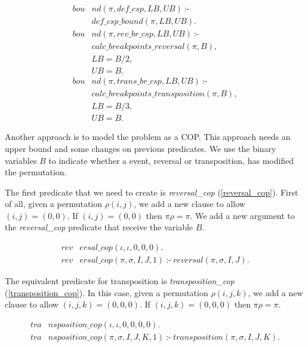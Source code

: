 \begin{align}
  \label{bound}
  \textit{bou}&\textit{nd}(\pi, def\_csp, LB, UB)~\text{:-} \nonumber\\
  &\textit{def\_csp\_bound}(\pi, LB, UB). \nonumber \\
  \textit{bou}&\textit{nd}(\pi, rev\_br\_csp, LB, UB)~\text{:-} \nonumber \\
  &\textit{calc\_breakpoints\_reversal}(\pi, B), \nonumber\\
  &LB = B / 2 ,  \\
  &UB = B. \nonumber \\
  \textit{bou}&\textit{nd}(\pi, trans\_br\_csp, LB, UB)~\text{:-} \nonumber\\
  &\textit{calc\_breakpoints\_transposition}(\pi, B), \nonumber\\
  &LB = B / 3, \nonumber \\
  &UB = B. \nonumber
\end{align}

Another approach is to model the problem as a COP. This approach needs
an upper bound and some changes on previous predicates. We use the
binary variables $B$ to indicate whether a event, reversal or
transposition, has modified the permutation.

The first predicate that we need to create is \textit{reversal\_cop}
(\ref{reversal_cop}).  First of all, given a permutation $\rho(i, j)$,
we add a new clause to allow $(i, j) = (0, 0)$. If $(i, j) = (0, 0)$
then $\pi\rho = \pi$. We add a new argument to the
\textit{reversal\_cop} predicate that receive the variable $B$.

\begin{align}
  \label{reversal_cop}
  \textit{rev}&\textit{ersal\_cop}(\iota, \iota, 0, 0, 0). \\
  \textit{rev}&\textit{ersal\_cop}(\pi, \sigma, I, J, 1)~\text{:-}~ 
  \textit{reversal}(\pi, \sigma, I, J). \nonumber
\end{align}

The equivalent predicate for transposition is
\textit{transposition\_cop} (\ref{transposition_cop}). In this case,
given a permutation $\rho(i, j, k)$, we add a new clause to allow $(i,
j, k) = (0, 0, 0)$. If $(i, j, k) = (0, 0, 0)$ then $\pi\rho = \pi$.

\begin{align}
  \label{transposition_cop}
  \textit{tra}&\textit{nsposition\_cop}(\iota, \iota, 0, 0, 0, 0). \\
  \textit{tra}&\textit{nsposition\_cop}(\pi, \sigma, I, J, K, 1)~\text{:-}~ 
  \textit{transposition}(\pi, \sigma, I, J, K). \nonumber
\end{align}

